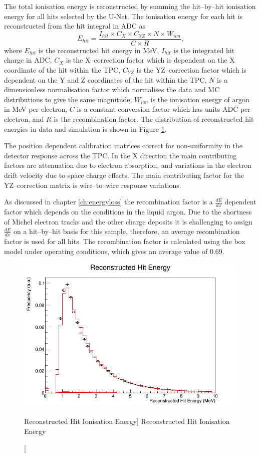 The total ionisation energy is reconstructed by summing the hit--by--hit
ionisation energy for all hits selected by the U-Net. The ionisation energy for
each hit is reconstructed from the hit integral in ADC as 
\begin{equation}
	E_{hit} = \frac{I_{hit} \times C_X \times C_{YZ} \times N \times W_{ion}}{C \times R}\mbox{,}
\end{equation}
where $E_{hit}$ is the reconstructed hit energy in MeV, $I_{hit}$ is the
integrated hit charge in ADC, $C_X$ is the X--correction factor which is
dependent on the X coordinate of the hit within the TPC, $C_{YZ}$ is the 
YZ--correction factor which is dependent on the Y and Z coordinates 
of the hit within the TPC, $N$ is a dimensionless normalisation factor which
normalises the data and MC distributions to give the same magnitude, $W_{ion}$
is the ionisation energy of argon in MeV per electron, $C$ is a constant
conversion factor which has units ADC per electron, and $R$ is the
recombination factor. The distribution of reconstructed hit energies in
\protodune{} data and simulation is shown in Figure \ref{fig:hit_ion_reco}.

The position dependent calibration matrices correct for non-uniformity in the
detector response across the TPC. In the X direction the main contributing
factors are attenuation due to electron absorption, and variations in the
electron drift velocity due to space charge effects. The main contributing
factor for the YZ--correction matrix is wire--to--wire response variations.

As discussed in chapter \ref{ch:energyloss} the recombination factor is a
$\frac{dE}{dx}$ dependent factor which depends on the conditions in the liquid
argon. Due to the shortness of Michel electron tracks and the other charge 
deposits it is challenging to assign $\frac{dE}{dx}$ on a hit--by--hit 
basis for this sample, therefore, an average recombination factor is used for 
all hits. The recombination factor is calculated using the box model 
\cite{Acciarri2013a} under \protodune{} operating conditions, which gives an
average value of 0.69.

\begin{figure}
	\centering
	\includegraphics[width=\textwidth]{figures/hit_ion_reco.png}
	\caption
	[Reconstructed Hit Ionisation Energy]
	{Reconstructed Hit Ionisation Energy}
	\label{fig:hit_ion_reco}
\end{figure}

